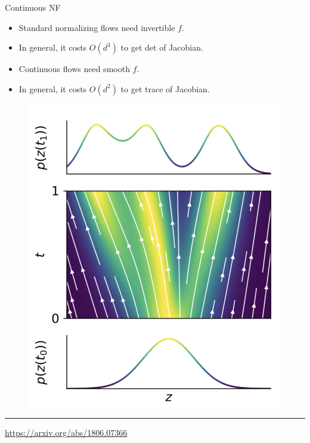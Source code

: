 \begin{frame}{Continuous NF}
	
	\begin{minipage}[t]{0.45\columnwidth}
		\begin{itemize}
			\item Standard normalizing flows need invertible $f$.
			\item In general, it costs $O(d^3)$ to get det of Jacobian.
			\item Continuous flows need smooth $f$.
			\item In general, it costs $O(d^2)$ to get trace of Jacobian.
		\end{itemize}
	\end{minipage}%
	\begin{minipage}[t]{0.55\columnwidth}
		\begin{figure}
			\centering
			\includegraphics[width=\linewidth]{figs/cnf_flow.png}
		\end{figure}
	\end{minipage}
\vfill
\hrule\medskip
{\scriptsize \href{https://arxiv.org/abs/1806.07366}{https://arxiv.org/abs/1806.07366}} 
\end{frame}

